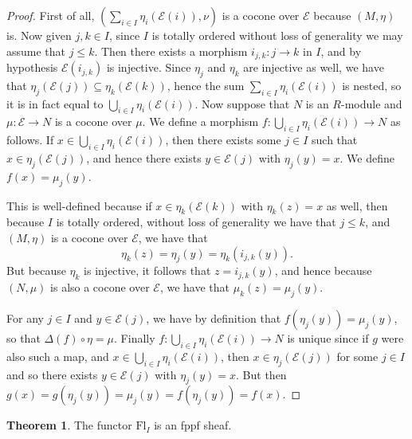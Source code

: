 \documentclass[oneside,11pt]{amsart}
\newcommand{\mE}{\ensuremath{\mathcal{E}}}
\newcommand{\Fl}{\ensuremath{\text{Fl}}}
\theoremstyle{definition}
\newtheorem{proof techniques}{Proof Techniques}
\newtheorem{theorem}{Theorem}
\begin{document}
\begin{proof}
First of all, $(\sum_{i \in I}\eta_i(\mE(i)) , \nu)$ is a cocone over $\mE$ because $(M , \eta)$ is. Now given $j , k \in I$, since $I$ is totally ordered without loss of generality we may assume that $j \leq k$. Then there exists a morphism $i_{j , k} : j \to k$ in $I$, and by hypothesis $\mE(i_{j , k})$ is injective. Since $\eta_j$ and $\eta_k$ are injective as well, we have that $\eta_j( \mE(j) ) \subseteq \eta_k(\mE(k))$, hence the sum $\sum_{i \in I}\eta_i(\mE(i))$ is nested, so it is in fact equal to $\bigcup_{i \in I} \eta_i(\mE(i))$. Now suppose that $N$ is an $R$-module and $\mu : \mE \to N$ is a cocone over $\mu$. We define a morphism $f : \bigcup_{i \in I}\eta_i(\mE(i)) \to N$ as follows. If $x \in \bigcup_{i \in I}\eta_i(\mE(i))$, then there exists some $j \in I$ such that $x \in \eta_j(\mE(j))$, and hence there exists $y \in \mE(j)$ with $\eta_j(y) = x$. We define $f(x) = \mu_j(y)$. 

This is well-defined because if $x \in \eta_k(\mE(k))$ with $\eta_k(z) = x$ as well, then because $I$ is totally ordered, without loss of generality we have that $j \leq k$, and $(M , \eta)$ is a cocone over $\mE$, we have that 
\begin{equation*}
\eta_k(z) = \eta_j(y) = \eta_k(i_{j , k}(y)). 
\end{equation*}
But because $\eta_k$ is injective, it follows that $z = i_{j , k}(y)$, and hence because $( N , \mu)$ is also a cocone over $\mE$, we have that $\mu_k (z) = \mu_j (y)$. 

For any $j \in I$ and $y \in \mE(j)$, we have by definition that $f (\eta_j(y) ) = \mu_j(y)$, so that $\Delta(f) \circ \eta = \mu$. Finally $f:  \bigcup_{i \in I}\eta_i(\mE(i)) \to N$ is unique since if $g$ were also such a map, and $x \in \bigcup_{i \in I}\eta_i(\mE(i))$, then $x \in \eta_j(\mE(j))$ for some $j \in I$ and so there exists $y \in \mE(j)$ with $\eta_j(y) = x$. But then $g(x) = g(\eta_j(y)) = \mu_j(y) = f(\eta_j(y)) = f(x)$. 
\end{proof}




\begin{theorem}
The functor $\Fl_I$ is an fppf sheaf. 
\end{theorem}
\end{document}

